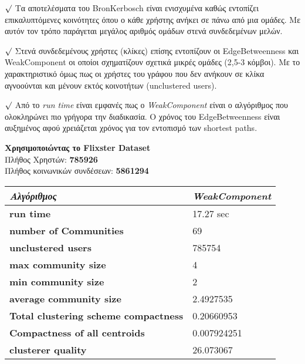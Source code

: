 $\surd$ \noindent
Τα αποτελέσματα του BronKerbosch είναι ενισχυμένα καθώς εντοπίζει επικαλυπτόμενες κοινότητες όπου 
ο κάθε χρήστης ανήκει σε πάνω από μια ομάδες. Με αυτόν τον τρόπο παράγεται μεγάλος αριθμός
 ομάδων στενά συνδεδεμένων μελών.

$\surd$ \noindent
Στενά συνδεδεμένους χρήστες (κλίκες) επίσης εντοπίζουν οι EdgeBetweenness και WeakComponent 
οι οποίοι σχηματίζουν σχετικά μικρές ομάδες (2,5-3 κόμβοι). Με το χαρακτηριστικό όμως πως 
οι χρήστες του γράφου που δεν ανήκουν σε κλίκα αγνοούνται και μένουν εκτός κοινοτήτων 
(unclustered users).

$\surd$ \noindent
Από το \emph{run time} είναι εμφανές πως ο \emph{WeakComponent} είναι ο αλγόριθμος 
που ολοκληρώνει πιο γρήγορα την διαδικασία. Ο χρόνος του EdgeBetweenness 
είναι αυξημένος 
αφού χρειάζεται χρόνος για τον εντοπισμό των shortest paths. 

\vspace{11mm}

\begin{center}
\noindent
\textbf{Χρησιμοποιώντας το Flixster Dataset} \\
Πλήθος Χρηστών: \textbf{785926}  \hfill \\
Πλήθος κοινωνικών συνδέσεων: \textbf{5861294}  \hfill \\
\end{center}

\begin{center}
  \begin{tabular}{ | p{5cm} | p{4cm} | }
    \hline
    \emph{Αλγόριθμος}				   & \emph{WeakComponent}  \\ \hline \hline
    \textbf{run time}			 	  & 17.27 sec    	    \\ \hline  
    \textbf{number of Communities} 	          & 69		\\ \hline
    \textbf{unclustered users} 	 	   & 785754 	      \\ \hline
    \textbf{max community size} 	 	  & 4 		   \\ \hline
    \textbf{min community size} 	 	      & 2 	       \\ \hline
    \textbf{average community size}	 	    & 2.4927535    \\ \hline
    \textbf{Total clustering scheme compactness}   & 0.20660953	 \\ \hline
    \textbf{Compactness of all centroids} 	     & 0.007924251	  \\ \hline
    \textbf{clusterer quality} 		    & 26.073067 	   \\ 
    \hline 
  \end{tabular}
\end{center}


